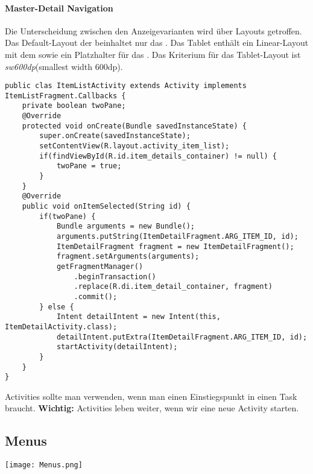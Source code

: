 \paragraph{Master-Detail Navigation} Die Unterscheidung zwischen den Anzeigevarianten wird über Layouts getroffen. Das Default-Layout der  beinhaltet nur das . Das Tablet enthält ein Linear-Layout mit dem  sowie ein Platzhalter für das . Das Kriterium für das Tablet-Layout ist \textit{sw600dp}(smallest width 600dp).
\begin{lstlisting}
public clas ItemListActivity extends Activity implements ItemListFragment.Callbacks {
    private boolean twoPane;
    @Override
    protected void onCreate(Bundle savedInstanceState) {
        super.onCreate(savedInstanceState);
        setContentView(R.layout.activity_item_list);
        if(findViewById(R.id.item_details_container) != null) {
            twoPane = true;
        }
    }
    @Override
    public void onItemSelected(String id) {
        if(twoPane) {
            Bundle arguments = new Bundle();
            arguments.putString(ItemDetailFragment.ARG_ITEM_ID, id);
            ItemDetailFragment fragment = new ItemDetailFragment();
            fragment.setArguments(arguments);
            getFragmentManager()
                .beginTransaction()
                .replace(R.di.item_detail_container, fragment)
                .commit();
        } else {
            Intent detailIntent = new Intent(this, ItemDetailActivity.class);
            detailIntent.putExtra(ItemDetailFragment.ARG_ITEM_ID, id);
            startActivity(detailIntent);
        }
    }
}
\end{lstlisting}
Activities sollte man verwenden, wenn man einen Einstiegspunkt in einen Task braucht. \textbf{Wichtig:} Activities leben weiter, wenn wir eine neue Activity starten.
\subsection{Menus}
\texttt{[image: Menus.png]}
